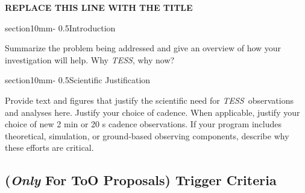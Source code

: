 \documentclass[letterpaper,11pt]{article}
\makeatletter
\renewcommand{\section}{\@startsection%
{section}{1}{0mm}{-\baselineskip}%
{0.5\baselineskip}{\normalfont\Large\bfseries}}%
\newcommand{\tess}{{\it TESS}}
\makeatother
\begin{document}
\pagestyle{plain}


 

\begin{center} 
\bfseries\uppercase{%
REPLACE THIS LINE WITH THE TITLE
}
\end{center}






\section{Introduction}

Summarize the problem being addressed and give an overview of how your investigation will help. 
Why \tess, why now?


\section{Scientific Justification}

Provide text and figures that justify the scientific need for \tess\ observations and analyses here. 
Justify your choice of cadence. When applicable, justify your choice of new 2 min or 20 s cadence observations. 
If your program includes theoretical, simulation, or ground-based observing components, describe why these efforts are critical.



\subsection{({\it Only} For ToO Proposals) Trigger Criteria}
\end{document}
